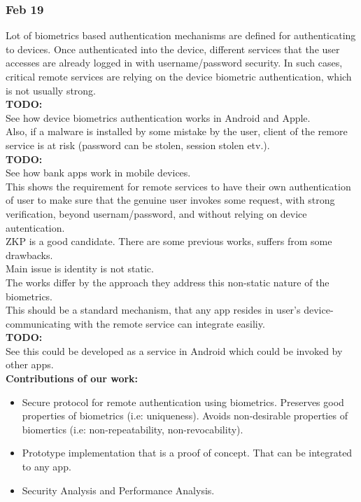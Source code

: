 \documentclass[11pt]{article}
\begin{document}
\subsubsection*{Feb 19}
Lot of biometrics based authentication mechanisms are defined for authenticating to devices. Once authenticated into the device, different services 
that the user accesses are already logged in with username/password security. In such cases, critical remote services are relying on the device 
biometric authentication, which is not usually strong.\\
\textbf{TODO:} \\ See how device biometrics authentication works in Android and Apple.\\
Also, if a malware is installed by some mistake by the user, client of the remore service is at risk (password can be stolen, session stolen etv.).\\ 
\textbf{TODO:}\\
See how bank apps work in mobile devices.\\

This shows the requirement for remote services to have their own authentication of user to make sure that the genuine user invokes some request, with 
strong verification, beyond usernam/password, and without relying on device autentication.\\
ZKP is a good candidate. There are some previous works, suffers from some drawbacks.\\ Main issue is identity is not static.\\
The works differ by the approach they address this non-static nature of the biometrics.\\

This should be a standard mechanism, that any app resides in user's device-communicating with the remote service can integrate easiliy.\\
\textbf{TODO:}\\
See this could be developed as a service in Android which could be invoked by other apps.\\

\textbf{Contributions of our work:}
\begin{itemize}
 \item Secure protocol for remote authentication using biometrics. Preserves good properties of biometrics (i.e: uniqueness). Avoids non-desirable 
properties of biomertics (i.e: non-repeatability, non-revocability).
 \item Prototype implementation that is a proof of concept. That can be integrated to any app.
 \item Security Analysis and Performance Analysis.
\end{itemize}
\end{document}
